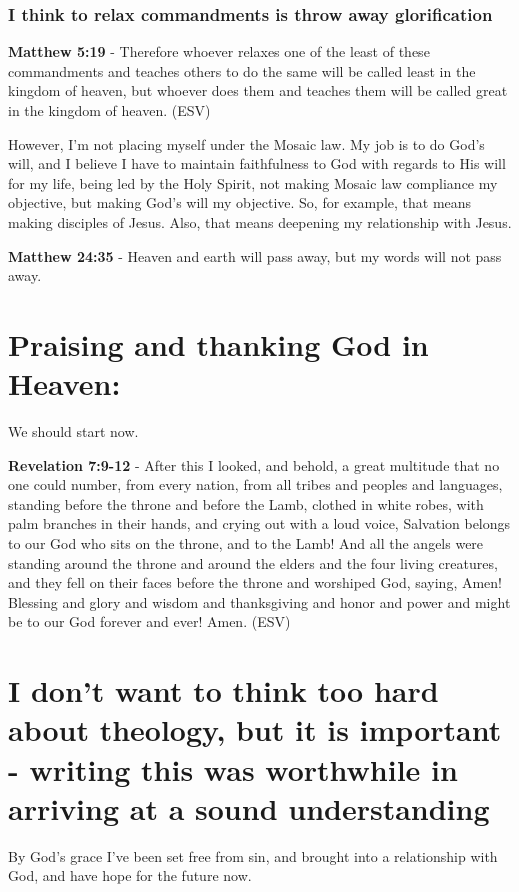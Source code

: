 \documentclass[11pt]{article}
\begin{document}
\subsubsection{I think to relax commandments is throw away glorification}
\label{sec:org6900810}
\textbf{Matthew 5:19} - Therefore whoever relaxes one of the least of these commandments and teaches others to do the same will be called least in the kingdom of heaven, but whoever does them and teaches them will be called great in the kingdom of heaven. (ESV)

However, I'm not placing myself under the Mosaic law.
My job is to do God's will, and I believe I have to maintain faithfulness to God with regards to His will for my life,
being led by the Holy Spirit, not making Mosaic law compliance my objective, but making God's will my objective.
So, for example, that means making disciples of Jesus.
Also, that means deepening my relationship with Jesus.

\textbf{Matthew 24:35} - Heaven and earth will pass away, but my words will not pass away.

\section{Praising and thanking God in Heaven:}
\label{sec:orgd2f44c7}
We should start now.

\textbf{Revelation 7:9-12} -   After this I looked, and behold, a great multitude that no one could number, from every nation, from all tribes and peoples and languages, standing before the throne and before the Lamb, clothed in white robes, with palm branches in their hands, and crying out with a loud voice, Salvation belongs to our God who sits on the throne, and to the Lamb! And all the angels were standing around the throne and around the elders and the four living creatures, and they fell on their faces before the throne and worshiped God, saying, Amen! Blessing and glory and wisdom and thanksgiving and honor and power and might be to our God forever and ever! Amen.  (ESV)

\section{I don't want to think too hard about theology, but it is important - writing this was worthwhile in arriving at a sound understanding}
\label{sec:orgca334c5}
By God's grace I've been set free from sin, and brought into a relationship with God, and have hope for the future now.
\end{document}
